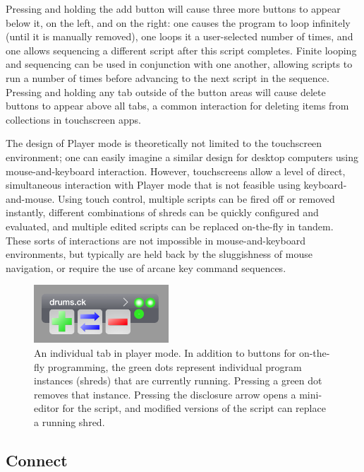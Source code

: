\documentclass{article}
\begin{document}
Pressing and holding the add button will cause three more buttons to appear below it, on the left, and on the right: one causes the program to loop infinitely (until it is manually removed), one loops it a user-selected number of times, and one allows sequencing a different script after this script completes. 
Finite looping and sequencing can be used in conjunction with one another, allowing scripts to run a number of times before advancing to the next script in the sequence. 
Pressing and holding any tab outside of the button areas will cause delete buttons to appear above all tabs, a common interaction for deleting items from collections in touchscreen apps. 

The design of Player mode is theoretically not limited to the touchscreen environment; one can easily imagine a similar design for desktop computers using mouse-and-keyboard interaction. 
However, touchscreens allow a level of direct, simultaneous interaction with Player mode that is not feasible using keyboard-and-mouse. 
Using touch control, multiple scripts can be fired off or removed instantly, different combinations of shreds can be quickly configured and evaluated, and multiple edited scripts can be replaced on-the-fly in tandem. 
These sorts of interactions are not impossible in mouse-and-keyboard environments, but typically are held back by the sluggishness of mouse navigation, or require the use of arcane key command sequences. 

\begin{figure}[h]
	\centering
		\includegraphics[width=0.45\textwidth]{figures/tab.png}
	\caption{An individual tab in player mode. 
	In addition to buttons for on-the-fly programming, the green dots represent individual program instances (shreds) that are currently running. 
	Pressing a green dot removes that instance. 
	Pressing the disclosure arrow opens a mini-editor for the script, and modified versions of the script can replace a running shred. 
	}
	\label{fig:tab}
\end{figure}

\subsection{Connect}
\end{document}
